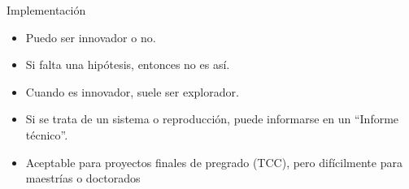 \begin{frame}{Implementación}
\begin{block}{}
\begin{itemize}
    \item Puedo ser innovador o no.
    \item Si falta una hipótesis, entonces no es así.
    \item Cuando es innovador, suele ser explorador.
    \item Si se trata de un sistema o reproducción, puede informarse en un “Informe técnico”.
    \item Aceptable para proyectos finales de pregrado (TCC), pero difícilmente para maestrías o doctorados
\end{itemize}
\end{block}
\end{frame}

